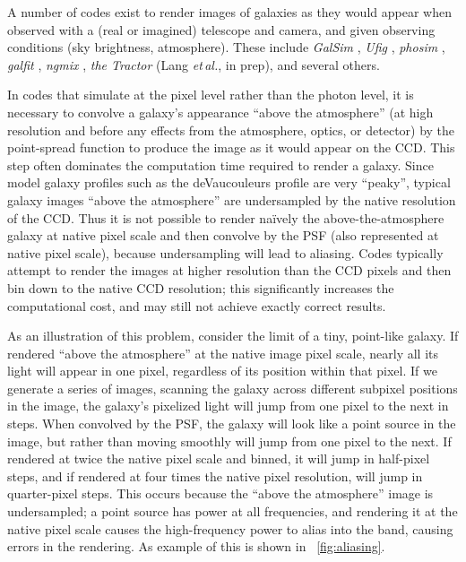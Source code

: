 \documentclass[11pt,preprint]{aastex}
\newcommand{\foreign}[1]{\emph{#1}}
\newcommand{\etal}{\foreign{et\,al.}}
\newcommand{\figref}[1]{\figurename~\ref{#1}}
\newcommand{\project}[1]{\textsl{#1}}
\begin{document}
A number of codes exist to render images of galaxies as they would
appear when observed with a (real or imagined) telescope and camera,
and given observing conditions (sky brightness, atmosphere).  These
include \project{GalSim} \citep{galsim}, \project{Ufig} \citep{ufig},
\project{phosim} \citep{phosim}, \project{galfit} \citep{galfit}, 
\project{ngmix} \citep{ngmix},
\project{the Tractor} (Lang \etal, in prep), and several others.


In codes that simulate at the pixel level rather than the photon
level, it is necessary to convolve a galaxy's appearance ``above the
atmosphere'' (at high resolution and before any effects from the
atmosphere, optics, or detector) by the point-spread function to
produce the image as it would appear on the CCD.  This step often
dominates the computation time required to render a galaxy.  Since
model galaxy profiles such as the deVaucouleurs profile are very
``peaky'', typical galaxy images ``above the atmosphere'' are
undersampled by the native resolution of the CCD.  Thus it is not
possible to render na\"ively the above-the-atmosphere galaxy at native
pixel scale and then convolve by the PSF (also represented at native
pixel scale), because undersampling will lead to aliasing.
Codes typically attempt to render the images at higher resolution than the
CCD pixels and then bin down to the native CCD resolution; this
significantly increases the computational cost, and may still not
achieve exactly correct results.



As an illustration of this problem, consider the limit of a tiny,
point-like galaxy.  If rendered ``above the atmosphere'' at the native
image pixel scale, nearly all its light will appear in one pixel,
regardless of its position within that pixel.  If we generate a series
of images, scanning the galaxy across different subpixel positions in
the image, the galaxy's pixelized light will jump from one pixel to
the next in steps.  When convolved by the PSF, the galaxy will look
like a point source in the image, but rather than moving smoothly will
jump from one pixel to the next.  If rendered at twice the native pixel
scale and binned, it will jump in half-pixel steps, and if rendered at
four times the native pixel resolution, will jump in quarter-pixel
steps.  This occurs because the ``above the atmosphere'' image is
undersampled; a point source has power at all frequencies, and
rendering it at the native pixel scale causes the high-frequency power
to alias into the band, causing errors in the rendering.  As example of this
is shown in \figref{fig:aliasing}.
\end{document}
